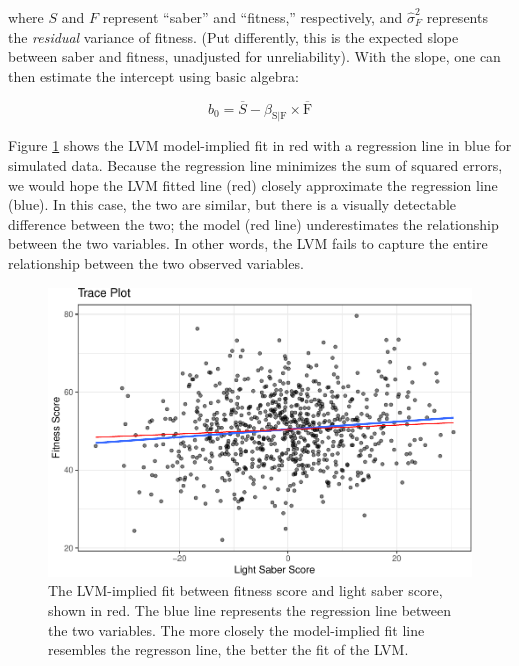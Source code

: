 \documentclass[
  english,
  doc]{apa6}
\begin{document}
where \(S\) and \(F\) represent ``saber'' and ``fitness,'' respectively, and \({\hat{\sigma}^2_F}\) represents the \emph{residual} variance of fitness. (Put differently, this is the expected slope between saber and fitness, unadjusted for unreliability). With the slope, one can then estimate the intercept using basic algebra:

\[b_0=\overline{S}-\beta_{\text{S}|\text{F}}\times \overline{\text{F}}\]

Figure \ref{fig:trace1} shows the LVM model-implied fit in red with a regression line in blue for simulated data. Because the regression line minimizes the sum of squared errors, we would hope the LVM fitted line (red) closely approximate the regression line (blue). In this case, the two are similar, but there is a visually detectable difference between the two; the model (red line) underestimates the relationship between the two variables. In other words, the LVM fails to capture the entire relationship between the two observed variables.

\begin{figure}
\centering
\includegraphics{flexplavaan_draft_files/figure-latex/trace1-1.pdf}
\caption{\label{fig:trace1}The LVM-implied fit between fitness score and light saber score, shown in red. The blue line represents the regression line between the two variables. The more closely the model-implied fit line resembles the regresson line, the better the fit of the LVM.}
\end{figure}
\end{document}
